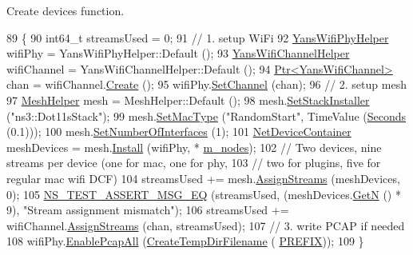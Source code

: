 Create devices function. 


\begin{DoxyCode}
89 \{
90   int64\_t streamsUsed = 0;
91   \textcolor{comment}{// 1. setup WiFi}
92   \hyperlink{classns3_1_1YansWifiPhyHelper}{YansWifiPhyHelper} wifiPhy = YansWifiPhyHelper::Default ();
93   \hyperlink{classns3_1_1YansWifiChannelHelper}{YansWifiChannelHelper} wifiChannel = YansWifiChannelHelper::Default ();
94   \hyperlink{classns3_1_1Ptr}{Ptr<YansWifiChannel>} chan = wifiChannel.\hyperlink{classns3_1_1YansWifiChannelHelper_a0532e292ab9452f3cf630c848708e563}{Create} ();
95   wifiPhy.\hyperlink{classns3_1_1YansWifiPhyHelper_ad2e9a27587dd4ff320435c93cc2676de}{SetChannel} (chan);
96   \textcolor{comment}{// 2. setup mesh}
97   \hyperlink{classns3_1_1MeshHelper}{MeshHelper} mesh = MeshHelper::Default ();
98   mesh.\hyperlink{classns3_1_1MeshHelper_ac1074aff829d0cde1659bdef572880ca}{SetStackInstaller} (\textcolor{stringliteral}{"ns3::Dot11sStack"});
99   mesh.\hyperlink{classns3_1_1MeshHelper_a549d568927a88e95a721f2be58232c10}{SetMacType} (\textcolor{stringliteral}{"RandomStart"}, TimeValue (\hyperlink{group__timecivil_ga33c34b816f8ff6628e33d5c8e9713b9e}{Seconds} (0.1)));
100   mesh.\hyperlink{classns3_1_1MeshHelper_adfc08b62a8d6e835d0fbbac7a349ef5f}{SetNumberOfInterfaces} (1);
101   \hyperlink{classns3_1_1NetDeviceContainer}{NetDeviceContainer} meshDevices = mesh.\hyperlink{classns3_1_1MeshHelper_a7b33f6ca7b6842b3def4479bc7526f2c}{Install} (wifiPhy, *
      \hyperlink{classPeerManagementProtocolRegressionTest_ac19c6874aa4fd4a8d22ee2df374a619c}{m\_nodes});
102   \textcolor{comment}{// Two devices, nine streams per device (one for mac, one for phy, }
103   \textcolor{comment}{// two for plugins, five for regular mac wifi DCF)}
104   streamsUsed += mesh.\hyperlink{classns3_1_1MeshHelper_a93e9c88a375a86c621a494aafe68882e}{AssignStreams} (meshDevices, 0);
105   \hyperlink{group__testing_ga2a9d78cffb3db8e867c35fff0b698cf5}{NS\_TEST\_ASSERT\_MSG\_EQ} (streamsUsed, (meshDevices.\hyperlink{classns3_1_1NetDeviceContainer_a74cafc212479bc38976bebd118e856b9}{GetN} () * 9), \textcolor{stringliteral}{"Stream
       assignment mismatch"});
106   streamsUsed += wifiChannel.\hyperlink{classns3_1_1YansWifiChannelHelper_ab409a15cfb8abb5195177625191e2584}{AssignStreams} (chan, streamsUsed);
107   \textcolor{comment}{// 3. write PCAP if needed}
108   wifiPhy.\hyperlink{classns3_1_1PcapHelperForDevice_a4ab183a2512120200d4a0e5d8ececd49}{EnablePcapAll} (\hyperlink{classns3_1_1TestCase_a8a04695a6fb9ba0f89e28e9523963f88}{CreateTempDirFilename} (
      \hyperlink{pmp-regression_8cc_a61dc66981fa47bfd0066a57a487c599c}{PREFIX}));
109 \}
\end{DoxyCode}


